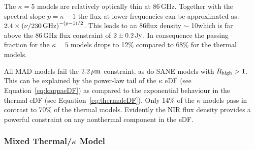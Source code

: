 The $\kappa=5$ models are relatively optically thin at 86\,GHz.
Together with the spectral slope $p=\kappa-1$ the flux at lower frequencies can be approximated as: $2.4\times \left(\nu/230\,\mathrm{GHz}\right)^{-(p-1)/2}$.
This leads to an 86\GHz flux density $\sim$ 10\Jy which is far above the 86\,GHz flux constraint of $2\pm0.2\,\mathrm{Jy}$.
In consequence the passing fraction for the $\kappa=5$ models drops to 12\% compared to 68\% for the thermal models.


All MAD models fail the $2.2\,\mu\mathrm{m}$ constraint, as do SANE models with $R_\mathrm{high}>1$.
This can be explained by the power-law tail of the $\kappa$ eDF (see Equation~\ref{eq:kappaeDF}) as compared to the exponential behaviour in the thermal eDF (see Equation~\ref{eq:thermaleDF}).
Only 14\% of the $\kappa$ models pass in contrast to 70\% of the thermal models.  Evidently the NIR flux density provides a powerful constraint on any nonthermal component in the eDF. 

\subsubsection{Mixed Thermal/\texorpdfstring{$\kappa$}{kappa} Model}

